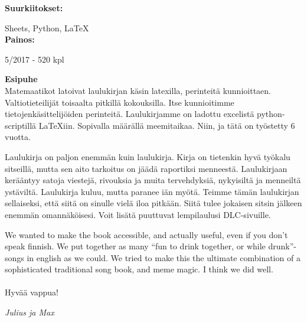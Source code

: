 \textbf{Suurkiitokset:}

Sheets, Python, \LaTeX
\\

\textbf{Painos:}

5/2017 - 520 kpl

\newpage

\textbf{Esipuhe}
\\

Matemaatikot latoivat laulukirjan käsin latexilla, perinteitä kunnioittaen.
Valtiotieteilijät toisaalta pitkillä kokouksilla. Itse kunnioitimme
tietojenkäsittelijöiden perinteitä. Laulu\-kirjamme on ladottu excelistä
python-scriptillä \LaTeX{}iin. Sopivalla määrällä mee\-mi\-taikaa. Niin, ja tätä on työstetty 6 vuotta.

Laulukirja on paljon enemmän kuin laulukirja. Kirja on tieten\-kin hyvä työkalu
sitseillä, mutta sen aito tarkoitus on jäädä ra\-por\-tik\-si menneestä. Laulukirjaan
kerääntyy satoja viestejä, rivouksia ja muita tervehdyksiä, nykyisiltä ja
menneiltä ystäviltä. Laulukirja kuluu, mutta paranee iän myötä. Teimme tämän
laulukirjan sel\-lai\-sek\-si, että siitä on sinulle vielä iloa pitkään. Siitä tulee
jokaisen sitsin jälkeen enemmän omannäköisesi. Voit lisätä puuttuvat lempi\-laulusi DLC-sivuille.

We wanted to make the book accessible, and actually useful, even if you don’t
speak finnish. We put together as many “fun to drink together, or while drunk”-songs
in english as we could. We tried to make this the ultimate combination of a
sophisticated traditional song book, and meme magic. I think we did well.
\\
\\
Hyvää vappua!

\vfill
\textit{Julius ja Max}

\newpage
